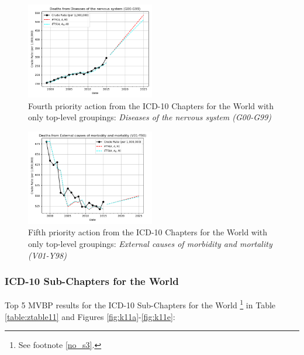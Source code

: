 \documentclass[10pt, a4paper, twocolumn]{IEEEconf}
\newcommand\footnotesstartsep{}
\begin{document}
\begin{figure}[H]
  \centering
  \includegraphics[width=0.5\textwidth]{results/WORLD_ICD10_CHAPTER_ROOTS/Diseases_of_the_nervous_system_G00-G99_ets.png}
  \caption{Fourth priority action from the ICD-10 Chapters for the World with only top-level groupings: \textit{Diseases of the nervous system (G00-G99)}}\label{fig:k10d}
\end{figure}

\begin{figure}[H]
  \centering
  \includegraphics[width=0.5\textwidth]{results/WORLD_ICD10_CHAPTER_ROOTS/External_causes_of_morbidity_and_mortality_V01-Y98_ets.png}
  \caption{Fifth priority action from the ICD-10 Chapters for the World with only top-level groupings: \textit{External causes of morbidity and mortality (V01-Y98)}}\label{fig:k10e}
\end{figure}

\clearpage

\subsubsection{ICD-10 Sub-Chapters for the World}

Top 5 MVBP results for the ICD-10 Sub-Chapters for the World \citep{whomortality}\footnotesstartsep\footnote{See footnote \ref{no_s3}.} in Table \ref{table:ztable11} and Figures \ref{fig:k11a}-\ref{fig:k11e}:
\end{document}
